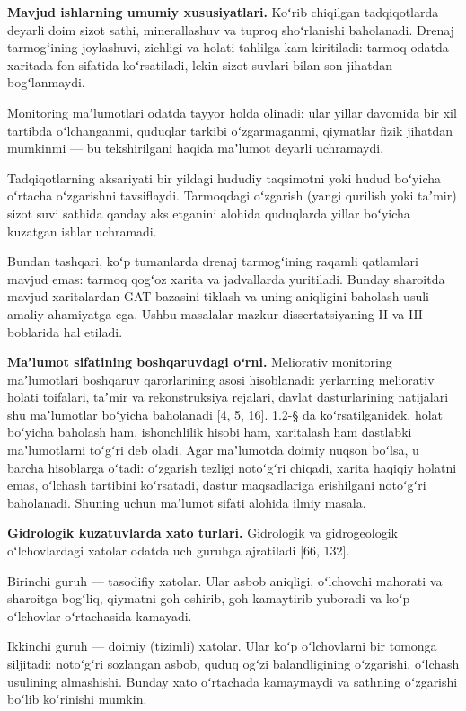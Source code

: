 \textbf{Mavjud ishlarning umumiy xususiyatlari.} Koʻrib chiqilgan
tadqiqotlarda deyarli doim sizot sathi, minerallashuv va tuproq
shoʻrlanishi baholanadi. Drenaj tarmogʻining joylashuvi, zichligi va
holati tahlilga kam kiritiladi: tarmoq odatda xaritada fon sifatida
koʻrsatiladi, lekin sizot suvlari bilan son jihatdan bogʻlanmaydi.

Monitoring maʼlumotlari odatda tayyor holda olinadi: ular yillar
davomida bir xil tartibda oʻlchanganmi, quduqlar tarkibi oʻzgarmaganmi,
qiymatlar fizik jihatdan mumkinmi --- bu tekshirilgani haqida maʼlumot
deyarli uchramaydi.

Tadqiqotlarning aksariyati bir yildagi hududiy taqsimotni yoki hudud
boʻyicha oʻrtacha oʻzgarishni tavsiflaydi. Tarmoqdagi oʻzgarish (yangi
qurilish yoki taʼmir) sizot suvi sathida qanday aks etganini alohida
quduqlarda yillar boʻyicha kuzatgan ishlar uchramadi.

Bundan tashqari, koʻp tumanlarda drenaj tarmogʻining raqamli qatlamlari
mavjud emas: tarmoq qogʻoz xarita va jadvallarda yuritiladi. Bunday
sharoitda mavjud xaritalardan GAT bazasini tiklash va uning aniqligini
baholash usuli amaliy ahamiyatga ega. Ushbu masalalar mazkur
dissertatsiyaning II va III boblarida hal etiladi.


\textbf{Maʼlumot sifatining boshqaruvdagi oʻrni.} Meliorativ monitoring
maʼlumotlari boshqaruv qarorlarining asosi hisoblanadi: yerlarning
meliorativ holati toifalari, taʼmir va rekonstruksiya rejalari, davlat
dasturlarining natijalari shu maʼlumotlar boʻyicha baholanadi {[}4, 5,
16{]}. 1.2-§ da koʻrsatilganidek, holat boʻyicha baholash ham,
ishonchlilik hisobi ham, xaritalash ham dastlabki maʼlumotlarni toʻgʻri
deb oladi. Agar maʼlumotda doimiy nuqson boʻlsa, u barcha hisoblarga
oʻtadi: oʻzgarish tezligi notoʻgʻri chiqadi, xarita haqiqiy holatni
emas, oʻlchash tartibini koʻrsatadi, dastur maqsadlariga erishilgani
notoʻgʻri baholanadi. Shuning uchun maʼlumot sifati alohida ilmiy
masala.

\textbf{Gidrologik kuzatuvlarda xato turlari.} Gidrologik va
gidrogeologik oʻlchovlardagi xatolar odatda uch guruhga ajratiladi
{[}66, 132{]}.

Birinchi guruh --- tasodifiy xatolar. Ular asbob aniqligi, oʻlchovchi
mahorati va sharoitga bogʻliq, qiymatni goh oshirib, goh kamaytirib
yuboradi va koʻp oʻlchovlar oʻrtachasida kamayadi.

Ikkinchi guruh --- doimiy (tizimli) xatolar. Ular koʻp oʻlchovlarni bir
tomonga siljitadi: notoʻgʻri sozlangan asbob, quduq ogʻzi balandligining
oʻzgarishi, oʻlchash usulining almashishi. Bunday xato oʻrtachada
kamaymaydi va sathning oʻzgarishi boʻlib koʻrinishi mumkin.

